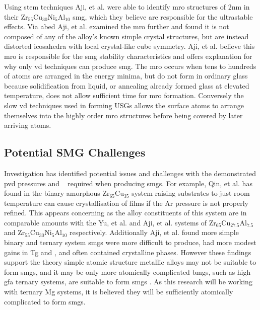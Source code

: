 \documentclass[a4paper,12pt,oneside]{report}%
\begin{document}
Using \acrshort{stem} techniques Aji, et al. \cite{Aji2013} were able to identify \gls{mro} structures of 2nm in their Zr$_{55}$Cu$_{30}$Ni$_{5}$Al$_{10}$ \gls{smg}, which they believe are responsible for the ultrastable effects. Via \gls{abed} Aji, et al. \cite{Aji2013} examined the \gls{mro} further and found it is not composed of any of the alloy's known simple crystal structures, but are instead distorted icosahedra with local crystal-like cube symmetry. Aji, et al. \cite{Aji2013} believe this \gls{mro} is responsible for the \gls{smg} stability characteristics and offers explanation for why only \gls{vd} techniques can produce \gls{smg}. The \gls{mro} occurs when tens to hundreds of atoms are arranged in the energy minima, but do not form in ordinary glass because solidification from liquid, or annealing already formed glass at elevated temperature, does not allow sufficient time for \gls{mro} formation. Conversely the slow \gls{vd} techniques used in forming USGs allows the surface atoms to arrange themselves into the highly order \gls{mro} structures before being covered by later arriving atoms. 

\subsection{Potential SMG Challenges}
Investigation has identified potential issues and challenges with the demonstrated \gls{pvd} pressures and \Tsub~ required when producing \glspl{smg}. For example, Qin, et al. \cite{Qin2009} has found in the binary amorphous Zr$_{65}$Cu$_{35}$ system raising substrates to just room temperature can cause crystallisation of films if the Ar pressure is not properly refined. This appears concerning as the alloy constituents of this system are in comparable amounts with the Yu, et al. \cite{Yu2013} and Aji, et al. \cite{Aji2013} systems of Zr$_{65}$Cu$_{27.5}$Al$_{7.5}$ and Zr$_{55}$Cu$_{30}$Ni$_{5}$Al$_{10}$ respectively. Additionally Aji, et al. \cite{Aji2013} found more simple binary and ternary system \glspl{smg} were more difficult to produce, had more modest gains in \gls{Tg} and \Tx, and often contained crystalline phases. However these findings support the theory simple atomic structure metallic alloys may not be suitable to form \glspl{smg}, and it may be only more atomically complicated \glspl{bmg}, such as high \gls{gfa} ternary systems, are suitable to form \glspl{smg} \cite{Yu2013}. As this research will be working with ternary Mg systems, it is believed they will be sufficiently atomically complicated to form \glspl{smg}. 
\end{document}
